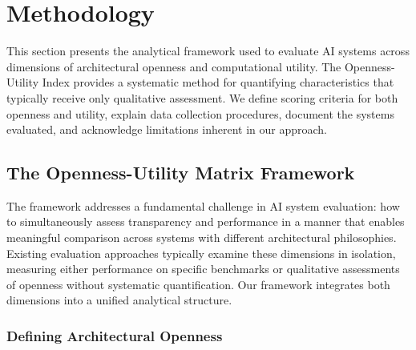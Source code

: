 
\section{Methodology}

This section presents the analytical framework used to evaluate AI systems across dimensions of architectural openness and computational utility. The Openness-Utility Index provides a systematic method for quantifying characteristics that typically receive only qualitative assessment. We define scoring criteria for both openness and utility, explain data collection procedures, document the systems evaluated, and acknowledge limitations inherent in our approach.

\subsection{The Openness-Utility Matrix Framework}

The framework addresses a fundamental challenge in AI system evaluation: how to simultaneously assess transparency and performance in a manner that enables meaningful comparison across systems with different architectural philosophies. Existing evaluation approaches typically examine these dimensions in isolation, measuring either performance on specific benchmarks or qualitative assessments of openness without systematic quantification. Our framework integrates both dimensions into a unified analytical structure.

\subsubsection{Defining Architectural Openness}

